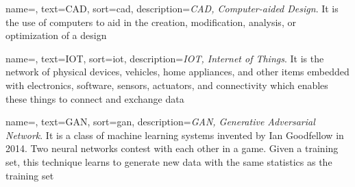  {
    name=,
    text=CAD,
    sort=cad,
    description={\emph{CAD, Computer-aided Design}. It is the use of computers to aid in the creation, modification, analysis, or optimization of a design}
}

 {
    name=,
    text=IOT,
    sort=iot,
    description={\emph{IOT, Internet of Things}. It is the network of physical devices, vehicles, home appliances, and other items embedded with electronics, software, sensors, actuators, and connectivity which enables these things to connect and exchange data}
}

 {
    name=,
    text=GAN,
    sort=gan,
    description={\emph{GAN, Generative Adversarial Network}. It is a class of machine learning systems invented by Ian Goodfellow in 2014. Two neural networks contest with each other in a game. Given a training set, this technique learns to generate new data with the same statistics as the training set}
}




